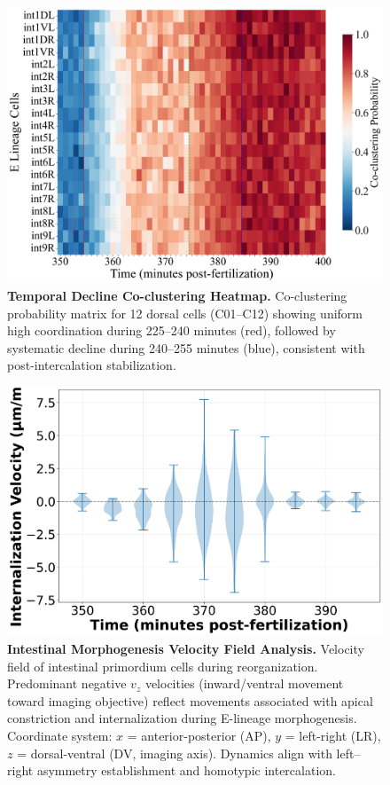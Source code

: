 \documentclass[unnumsec,webpdf,modern,large,namedate]{oup-authoring-template}%
\theoremstyle{thmstyleone}\newtheorem{theorem}{Theorem}
\theoremstyle{thmstyletwo}\newtheorem{example}{Example}
\theoremstyle{thmstylethree}\newtheorem{definition}{Definition}
\begin{document}
\begin{figure}[t]
  \centering
  \includegraphics[width=\linewidth]{Demo4_Intestinal_Coclustering_Heatmap.png}
  \caption{\textbf{Temporal Decline Co-clustering Heatmap.} Co-clustering probability matrix for 12 dorsal cells (C01--C12) showing uniform high coordination during 225--240 minutes (red), followed by systematic decline during 240--255 minutes (blue), consistent with post-intercalation stabilization.}
  \label{fig:decline}
\end{figure}

\begin{figure}[t]
  \centering
  \includegraphics[width=\linewidth]{Demo6_Intestinal_Velocity_Field.png}
  \caption{\textbf{Intestinal Morphogenesis Velocity Field Analysis.} Velocity field of intestinal primordium cells during reorganization. Predominant negative $v_z$ velocities (inward/ventral movement toward imaging objective) reflect movements associated with apical constriction and internalization during E-lineage morphogenesis. Coordinate system: $x$ = anterior-posterior (AP), $y$ = left-right (LR), $z$ = dorsal-ventral (DV, imaging axis). Dynamics align with left--right asymmetry establishment and homotypic intercalation.}
  \label{fig:int_velocity}
\end{figure}
\end{document}
